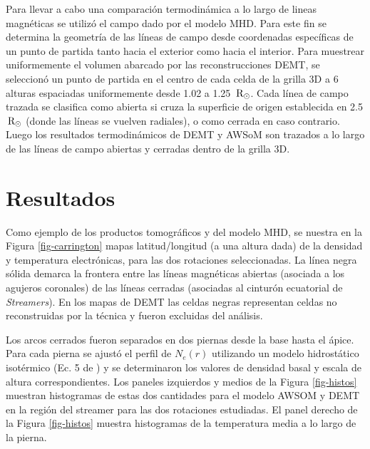 \documentclass[baaa]{baaa}
\begin{document}
Para llevar a cabo una comparación termodinámica a lo largo de lineas magnéticas se utilizó el campo dado por el modelo MHD. Para este fin se determina la geometría de las líneas de campo desde coordenadas específicas de un punto de partida tanto hacia el exterior como hacia el interior. Para muestrear uniformemente el volumen abarcado por las reconstrucciones DEMT, se seleccionó un punto de partida en el centro de cada celda de la grilla 3D a 6 alturas espaciadas uniformemente desde 1.02 a 1.25 $\,{\rm R_\odot}$. Cada línea de campo trazada se clasifica como abierta si cruza la superficie de origen establecida en 2.5$\,{\rm R_\odot}$ (donde las líneas se vuelven radiales), o como cerrada en caso contrario. Luego los resultados termodinámicos de DEMT y AWSoM son trazados a lo largo de las líneas de campo abiertas y cerradas dentro de la grilla 3D. 





\section{Resultados}
Como ejemplo de los productos tomográficos y del modelo MHD, se nuestra en la Figura \ref{fig-carrington} mapas latitud/longitud (a una altura dada) de la densidad y temperatura electrónicas, para las dos rotaciones seleccionadas. La línea negra sólida demarca la frontera entre las líneas magnéticas abiertas (asociada a los agujeros coronales) de las líneas cerradas (asociadas al cinturón ecuatorial de \emph{Streamers}). En los mapas de DEMT las celdas negras representan celdas no reconstruidas por la técnica y fueron excluidas del análisis.


Los arcos cerrados fueron separados en dos piernas desde la base hasta el ápice. Para cada  pierna  se ajustó el perfil de $N_e(r)$ utilizando un modelo hidrostático isotérmico (Ec. 5 de \citet{lloveras_2017}) y se determinaron los valores de densidad basal y escala de altura correspondientes. Los paneles izquierdos y medios de la Figura \ref{fig-histos} muestran histogramas de estas dos cantidades para el modelo AWSOM  y DEMT en la región del streamer para las dos rotaciones estudiadas. El panel derecho de la Figura \ref{fig-histos} muestra histogramas de la temperatura media a lo largo de la pierna.
\end{document}
